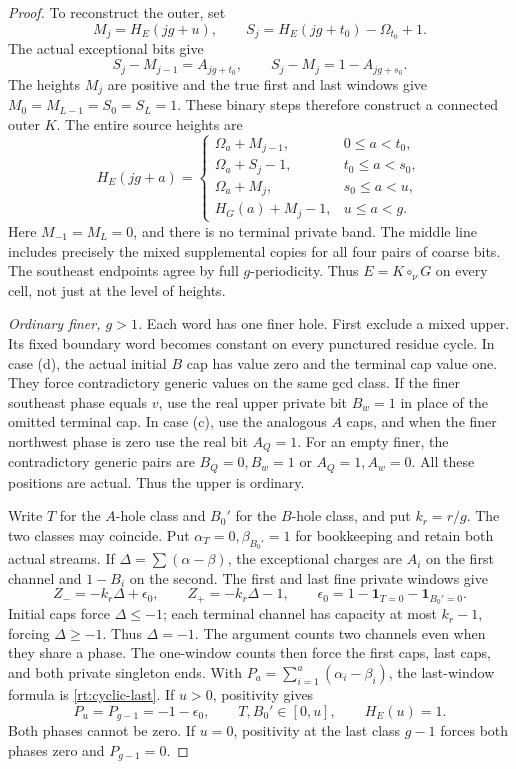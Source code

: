 \documentclass[11pt,a4paper]{amsart}
\numberwithin{equation}{section}
\theoremstyle{plain}
\theoremstyle{definition}
\newcommand{\one}{\mathbf1}
\begin{document}
\begin{proof}
To reconstruct the outer, set
\[
 M_j=H_E(jg+u),\qquad
 S_j=H_E(jg+t_0)-\Omega_{t_0}+1.
\]
The actual exceptional bits give
\[
 S_j-M_{j-1}=A_{jg+t_0},\qquad
 S_j-M_j=1-A_{jg+s_0}.
\]
The heights \(M_j\) are positive and the true first and last windows give \(M_0=M_{L-1}=S_0=S_L=1\).  These binary steps therefore construct a connected outer \(K\).  The entire source heights are
\begin{equation}\label{rt:mixed-fold-profile}
 H_E(jg+a)=
 \begin{cases}
 \Omega_a+M_{j-1},&0\le a<t_0,\\
 \Omega_a+S_j-1,&t_0\le a<s_0,\\
 \Omega_a+M_j,&s_0\le a<u,\\
 H_G(a)+M_j-1,&u\le a<g.
 \end{cases}
\end{equation}
Here \(M_{-1}=M_L=0\), and there is no terminal private band.  The middle line includes precisely the mixed supplemental copies for all four pairs of coarse bits.  The southeast endpoints agree by full \(g\)-periodicity.  Thus \(E=K\circ_\nu G\) on every cell, not just at the level of heights.

\smallskip\noindent\emph{Ordinary finer, \(g>1\).}
Each word has one finer hole.  First exclude a mixed upper.  Its fixed boundary word becomes constant on every punctured residue cycle.  In case (d), the actual initial \(B\) cap has value zero and the terminal cap value one.  They force contradictory generic values on the same gcd class.  If the finer southeast phase equals \(v\), use the real upper private bit \(B_w=1\) in place of the omitted terminal cap.  In case (c), use the analogous \(A\) caps, and when the finer northwest phase is zero use the real bit \(A_Q=1\).  For an empty finer, the contradictory generic pairs are \(B_Q=0,B_w=1\) or \(A_Q=1,A_w=0\).  All these positions are actual.  Thus the upper is ordinary.

Write \(T\) for the \(A\)-hole class and \(B_0'\) for the \(B\)-hole class, and put \(k_r=r/g\).  The two classes may coincide.  Put \(\alpha_T=0,\beta_{B_0'}=1\) for bookkeeping and retain both actual streams.  If \(\Delta=\sum(\alpha-\beta)\), the exceptional charges are \(A_i\) on the first channel and \(1-B_i\) on the second.  The first and last fine private windows give
\[
 Z_-=-k_r\Delta+\epsilon_0,\qquad Z_+=-k_r\Delta-1,
 \qquad \epsilon_0=1-\one_{T=0}-\one_{B_0'=0}.
\]
Initial caps force \(\Delta\le-1\); each terminal channel has capacity at most \(k_r-1\), forcing \(\Delta\ge-1\).  Thus \(\Delta=-1\).  The argument counts two channels even when they share a phase.  The one-window counts then force the first caps, last caps, and both private singleton ends.  With \(P_a=\sum_{i=1}^a(\alpha_i-\beta_i)\), the last-window formula is \eqref{rt:cyclic-last}.  If \(u>0\), positivity gives
\[
 P_u=P_{g-1}=-1-\epsilon_0,
 \qquad T,B_0'\in[0,u],\qquad H_E(u)=1.
\]
Both phases cannot be zero.  If \(u=0\), positivity at the last class \(g-1\) forces both phases zero and \(P_{g-1}=0\).


\end{proof}
\end{document}

